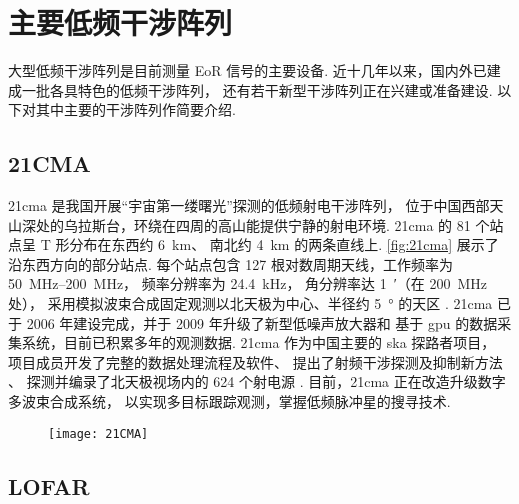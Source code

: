 \section{主要低频干涉阵列}
\label{sec:instruments}

大型低频干涉阵列是目前测量 EoR 信号的主要设备.
近十几年以来，国内外已建成一批各具特色的低频干涉阵列，
还有若干新型干涉阵列正在兴建或准备建设.
以下对其中主要的干涉阵列作简要介绍.

\subsection{21CMA}

\acf{21cma} 是我国开展“宇宙第一缕曙光”探测的低频射电干涉阵列，
位于中国西部天山深处的乌拉斯台，环绕在四周的高山能提供宁静的射电环境.
\acs{21cma} 的 81 个站点呈 T 形分布在东西约 \SI{6}{\km}、
南北约 \SI{4}{\km} 的两条直线上.
\autoref{fig:21cma} 展示了沿东西方向的部分站点.
每个站点包含 127 根对数周期天线，工作频率为 \SIrange{50}{200}{\MHz}，
频率分辨率为 \SI{24.4}{\kHz}，
角分辨率达 \SI{1}{\arcminute}（在 \SI{200}{\MHz} 处），
采用模拟波束合成固定观测以北天极为中心、半径约 \SI{5}{\degree} 的天区
\cite{wang2013,zheng2016}.
\acs{21cma} 已于 2006 年建设完成，并于 2009 年升级了新型低噪声放大器和
基于 \acs{gpu} 的数据采集系统，目前已积累多年的观测数据.
\acs{21cma} 作为中国主要的 \acs{ska} 探路者项目，
项目成员开发了完整的数据处理流程及软件、
提出了射频干涉探测及抑制新方法 \cite{huang2016}、
探测并编录了北天极视场内的 624 个射电源 \cite{zheng2016}.
目前，\acs{21cma} 正在改造升级数字多波束合成系统，
以实现多目标跟踪观测，掌握低频脉冲星的搜寻技术.

\begin{figure}[htp]
  \centering
  \texttt{[image: 21CMA]}
  \label{fig:21cma}
\end{figure}

\subsection{LOFAR}

